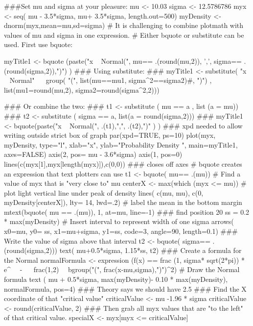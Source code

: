 \begin{Schunk}
\begin{Sinput}
 ###Set mu and sigma at your pleasure:
 mu <- 10.03
 sigma <- 12.5786786
 myx <- seq( mu - 3.5*sigma,  mu+ 3.5*sigma, length.out=500)
 myDensity <- dnorm(myx,mean=mu,sd=sigma)
 # It is challenging to combine plotmath with values of mu and sigma in one expression.
 # Either bquote or substitute can be used.  First use bquote:
 
 myTitle1 <- bquote (paste("x ~ Normal(", mu== .(round(mu,2)), ',', sigma== .(round(sigma,2)),")") )
 ### Using substitute:
 ### myTitle1 <-  substitute( "x ~ Normal" ~~ group( "(", list(mu==mu1, sigma^2==sigma2)#, ")") ,  list(mu1=round(mu,2), sigma2=round(sigma^2,2)))
 
 ### Or combine the two:
 ### t1 <- substitute ( mu == a ,  list (a = mu))
 ### t2 <- substitute ( sigma == a, list(a = round(sigma,2)))
 ### myTitle1 <- bquote(paste("x ~ Normal(", .(t1),",", .(t2),")" ) )
 ### xpd needed to allow writing outside strict box of graph
 par(xpd=TRUE, ps=10)
 plot(myx, myDensity, type="l", xlab="x", ylab="Probability Density ", main=myTitle1, axes=FALSE)
 axis(2, pos= mu - 3.6*sigma)
 axis(1, pos=0)
 lines(c(myx[1],myx[length(myx)]),c(0,0)) ### closes off axes
 # bquote creates an expression that text plotters can use
 t1 <-  bquote( mu== .(mu))
 # Find a value of myx that is "very close to" mu
 centerX <- max(which (myx <= mu))
 # plot light vertical line under peak of density
 lines( c(mu, mu), c(0, myDensity[centerX]), lty= 14, lwd=.2)
 # label the mean in the bottom margin
 mtext(bquote( mu == .(mu)), 1, at=mu, line=-1)
 ### find position 20% "up" vertically, to use for arrow coordinate
 ss = 0.2 * max(myDensity)
 # Insert interval to represent width of one sigma
 arrows( x0=mu, y0= ss, x1=mu+sigma, y1=ss, code=3, angle=90, length=0.1)
 ### Write the value of sigma above that interval
 t2 <-  bquote( sigma== .(round(sigma,2)))
 text( mu+0.5*sigma, 1.15*ss, t2)
 ### Create a formula for the Normal
 normalFormula <- expression (f(x) == frac (1, sigma* sqrt(2*pi)) * e^{~~ - ~~ frac(1,2)~~ bgroup("(", frac(x-mu,sigma),")")^2})
 # Draw the Normal formula
 text ( mu + 0.5*sigma, max(myDensity)- 0.10 * max(myDensity),  normalFormula, pos=4)
 ### Theory says we should have 2.5% of the area to the left of: -1.96 * sigma.
 ### Find the X coordinate of that "critical value"
 criticalValue <- mu -1.96 * sigma
 criticalValue <- round(criticalValue, 2)
 ### Then grab all myx values that are "to the left" of that critical value.
 specialX <-  myx[myx <= criticalValue]

\end{Sinput}
\end{Schunk}

